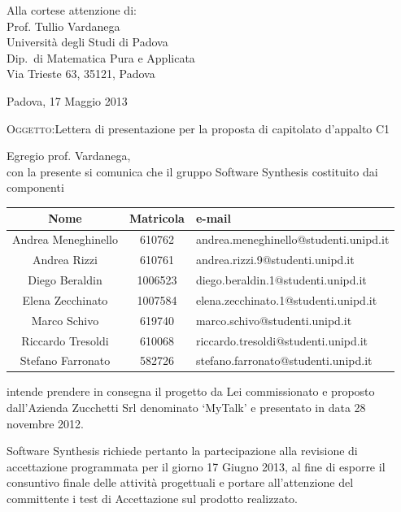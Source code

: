 \documentclass[a4paper,10pt]{letter}
\begin{document}
\begin{flushright}
\begin{minipage}[t]{.5\textwidth}
Alla cortese attenzione di:\\
Prof. Tullio Vardanega\\
Università degli Studi di Padova\\
Dip.~di Matematica Pura e Applicata\\
Via Trieste 63, 35121, Padova\\
\end{minipage}
\end{flushright}

Padova, 17 Maggio 2013

\textsc{Oggetto:}Lettera di presentazione per la proposta di capitolato d’appalto C1

\noindent{}Egregio prof. Vardanega,\\
\hspace*{11em} con la presente si comunica che il gruppo Software Synthesis costituito dai componenti

\begin{center}
\begin{tabular} {c|c|l}
{\bf Nome}&{\bf Matricola}&{\bf e-mail}\\ 
\hline
Andrea Meneghinello & 610762& andrea.meneghinello@studenti.unipd.it\\
Andrea Rizzi & 610761&andrea.rizzi.9@studenti.unipd.it\\
Diego Beraldin& 1006523& diego.beraldin.1@studenti.unipd.it\\
Elena Zecchinato&1007584&elena.zecchinato.1@studenti.unipd.it\\
Marco Schivo &619740& marco.schivo@studenti.unipd.it\\
Riccardo Tresoldi &610068 &riccardo.tresoldi@studenti.unipd.it\\
Stefano Farronato &582726&stefano.farronato@studenti.unipd.it\\
\end{tabular}
\end{center}

intende prendere in consegna il progetto da Lei commissionato e proposto dall'Azienda Zucchetti Srl denominato `MyTalk' e presentato in data 28 novembre 2012.

Software Synthesis richiede pertanto la partecipazione alla revisione di accettazione programmata per il giorno 17 Giugno 2013, al fine di esporre il consuntivo finale delle attività progettuali e portare all'attenzione del committente i test di Accettazione sul prodotto realizzato.
\end{document}
